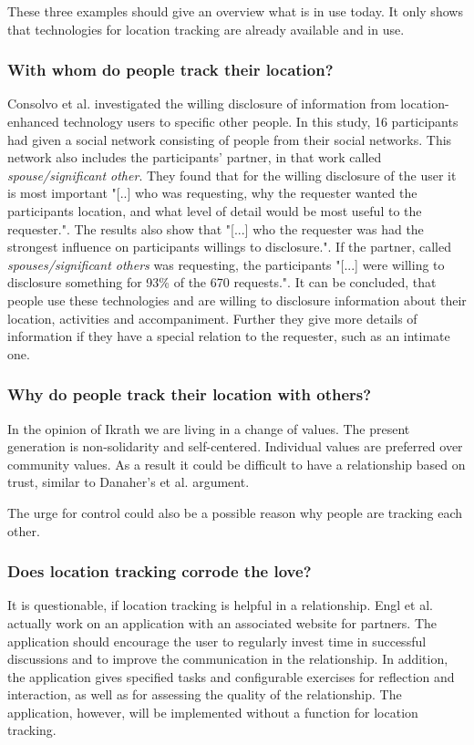 These three examples should give an overview what is in use today. 
It only shows that technologies for location tracking are already available and in use.

\subsubsection{With whom do people track their location?}
Consolvo et al. \cite{Consolvo:2005:LDS:1054972.1054985}  investigated the willing disclosure of information from location-enhanced technology users to specific other people. In this study, 16 participants had given a social network consisting of people from their social networks. This network also includes the participants' partner, in that work called \textit{spouse/significant other}. They found that for the willing disclosure of the user it is most important "[..] who was requesting, why the requester wanted the participants location, and what level of detail would be most useful to the requester.". The results also show that "[...] who the requester was had the strongest influence on participants willings to disclosure.". If the partner, called \textit{spouses/significant others} was requesting, the participants "[...] were willing to disclosure something for 93\% of the 670 requests.".
It can be concluded, that people use these technologies and are willing to disclosure information about their location, activities and accompaniment. Further they give more details of information if they have a special relation to the requester, such as an intimate one.

\subsubsection{Why do people track their location with others?}

In the opinion of Ikrath \cite{Ikrath2018} we are living in a change of values. The present generation is non-solidarity and self-centered. Individual values are preferred over community values.  
As a result it could be difficult to have a relationship based on trust, similar to Danaher's et al. \cite{doi:10.1080/15265161.2017.1409823} argument.

The urge for control could also be a possible reason why people are tracking each other.

\subsubsection{Does location tracking corrode the love?}
It is questionable, if location tracking is helpful in a relationship.
Engl et al. \cite{engl2016} actually work on an application with an associated website for partners.
The application should encourage the user to regularly invest time in successful discussions and to improve the communication in the relationship.
In addition, the application gives specified tasks and configurable exercises for reflection and interaction, as well as for assessing the quality of the relationship.
The application, however, will be implemented without a function for location tracking.

